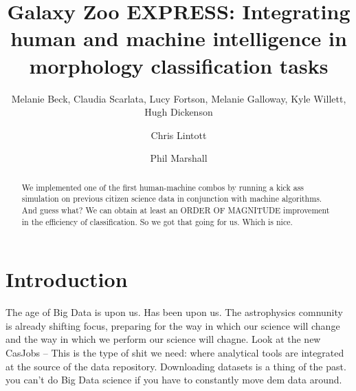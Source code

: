 \documentclass[twocolumn]{aastex6}
\begin{document}
\title{Galaxy Zoo EXPRESS: Integrating human and machine intelligence in morphology classification tasks}


\author{Melanie Beck, Claudia Scarlata, Lucy Fortson, Melanie Galloway, Kyle Willett, Hugh Dickenson}%


\author{Chris Lintott}

\author{Phil Marshall}


\begin{abstract}

We implemented one of the first human-machine combos by running a kick ass
simulation on previous citizen science data in conjunction with machine algorithms. 
And guess what? We can obtain at least an ORDER OF MAGNITUDE improvement in the 
efficiency of classification. So we got that going for us. Which is nice. 

\end{abstract}



\section{Introduction} \label{sec:intro}
The age of Big Data is upon us. Has been upon us. The astrophysics comnunity is 
already shifting focus, preparing for the way in which our science will change and 
the way in which we perform our science will chagne. Look at the new CasJobs -- 
This is the type of shit we need: where analytical tools are integrated at the source
of the data repository. Downloading datasets is a thing of the past. you can't do 
Big Data science if you have to constantly move dem data around. 
\end{document}
